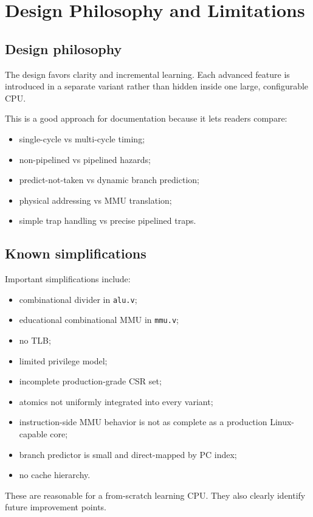 \section{Design Philosophy and Limitations}

\subsection{Design philosophy}

The design favors clarity and incremental learning. Each advanced feature is introduced in a separate variant rather than hidden inside one large, configurable CPU.

This is a good approach for documentation because it lets readers compare:

\begin{itemize}
\item single-cycle vs multi-cycle timing;
\item non-pipelined vs pipelined hazards;
\item predict-not-taken vs dynamic branch prediction;
\item physical addressing vs MMU translation;
\item simple trap handling vs precise pipelined traps.
\end{itemize}
\subsection{Known simplifications}

Important simplifications include:

\begin{itemize}
\item combinational divider in \texttt{alu.v};
\item educational combinational MMU in \texttt{mmu.v};
\item no TLB;
\item limited privilege model;
\item incomplete production-grade CSR set;
\item atomics not uniformly integrated into every variant;
\item instruction-side MMU behavior is not as complete as a production Linux-capable core;
\item branch predictor is small and direct-mapped by PC index;
\item no cache hierarchy.
\end{itemize}
These are reasonable for a from-scratch learning CPU. They also clearly identify future improvement points.

\bigskip
